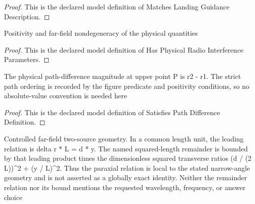 \begin{proof}
  This is the declared model definition of Matches Landing Guidance Description.
\end{proof}
\begin{definition}
  \label{def:physics:phyx-mini-0247:phyxminiproblems-problemphyxmini0247-hasphysicalradiointerferenceparameters}
  Positivity and far-field nondegeneracy of the physical quantities
\end{definition}
\begin{proof}
  This is the declared model definition of Has Physical Radio Interference Parameters.
\end{proof}
\begin{definition}
  \label{def:physics:phyx-mini-0247:phyxminiproblems-problemphyxmini0247-satisfiespathdifferencedefinition}
  The physical path-difference magnitude at upper point P is r2 - r1. The strict path ordering is recorded by the figure predicate and positivity conditions, so no absolute-value convention is needed here
\end{definition}
\begin{proof}
  This is the declared model definition of Satisfies Path Difference Definition.
\end{proof}
\begin{definition}
  \label{def:physics:phyx-mini-0247:phyxminiproblems-problemphyxmini0247-satisfiescontrolledfarfieldpathdifferencemodel}
  Controlled far-field two-source geometry. In a common length unit, the leading relation is delta r * L = d * y. The named squared-length remainder is bounded by that leading product times the dimensionless squared transverse ratios (d / (2 L))\textasciicircum{}2 + (y / L)\textasciicircum{}2. Thus the paraxial relation is local to the stated narrow-angle geometry and is not asserted as a globally exact identity. Neither the remainder relation nor its bound mentions the requested wavelength, frequency, or answer choice
\end{definition}
